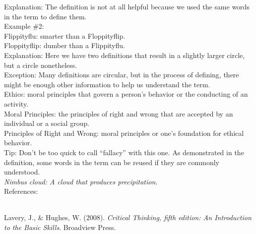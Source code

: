 \documentclass[a4paper,12pt,single,pdftex]{scrbook}
\begin{document}
    
      Explanation: The definition is not at all helpful because we used the same words in the term to define them.
    \\

    
      Example \#2:
    \\

    
      Flippityflu: smarter than a Floppityflip.
    \\

    
      Floppityflip: dumber than a Flippityflu.
    \\

    
      Explanation: Here we have two definitions that result in a slightly larger circle, but a circle nonetheless.
    \\

    
      Exception: Many definitions are circular, but in the process of defining, there might be enough other information to help us understand the term.
    \\

    
      Ethics: moral principles that govern a person's behavior or the conducting of an activity.
    \\

    
      Moral Principles: the principles of right and wrong that are accepted by an individual or a social group.
    \\

    
      Principles of Right and Wrong: moral principles or one's foundation for ethical behavior.
    \\

    
      Tip: Don’t be too quick to call “fallacy” with this one. As demonstrated in the definition, some words in the term can be reused if they are commonly understood.
    \\

    
      {\em Nimbus cloud: A cloud that produces precipitation.}
    \\

    References:

    
      
        
      \\

      
        
          Lavery, J., \& Hughes, W. (2008). {\it Critical Thinking, fifth edition: An Introduction to the Basic Skills}. Broadview Press.
        
      
    
  
\end{document}
